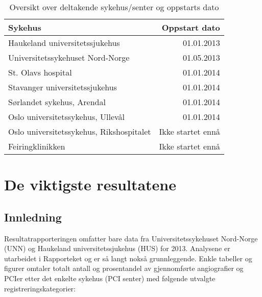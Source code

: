 \documentclass[norsk, a4paper]{report}
\begin{document}
\begin{table}[ht]
\centering
\begin{tabular}{lr}
    \toprule
    Sykehus & Oppstart dato\\
    \midrule
    Haukeland universitetssjukehus & 01.01.2013\\
    Universitetssykehuset Nord-Norge & 01.05.2013\\
    St. Olavs hospital & 01.01.2014\\
    Stavanger universitetssjukehus & 01.01.2014\\
    Sørlandet sykehus, Arendal & 01.01.2014\\
    Oslo universitetssykehus, Ullevål & 01.01.2014\\
    Oslo universitetssykehus, Rikshospitalet & Ikke startet ennå\\
    Feiringklinikken & Ikke startet ennå\\
    \bottomrule
\end{tabular}
\label{tab:oppstart}
\caption{Oversikt over deltakende sykehus/senter og oppstarts dato}
\end{table}

\clearpage



\chapter{De viktigste resultatene}

\section{Innledning}

Resultatrapporteringen omfatter bare data fra Universitetssykehuset Nord-Norge (UNN) og Haukeland universitetssjukehus (HUS) for 2013. Analysene er utarbeidet i Rapporteket og er så langt nokså grunnleggende. 
Enkle tabeller og figurer omtaler totalt antall og prosentandel av gjennomførte angiografier og PCIer etter det enkelte sykehus (PCI senter) med følgende utvalgte registreringskategorier:
\end{document}
